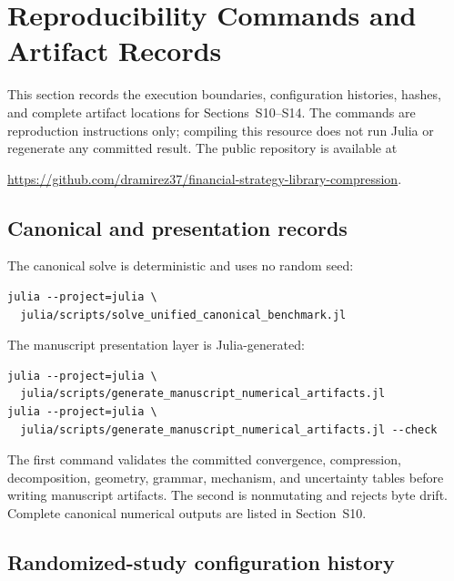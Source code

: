 \section{Reproducibility Commands and Artifact Records}
\label{sec:supp-reproducibility}

This section records the execution boundaries, configuration histories,
hashes, and complete artifact locations for Sections~S10--S14. The commands
are reproduction instructions only; compiling this resource does not run
Julia or regenerate any committed result.  The public repository is available
at
\begin{center}
\url{https://github.com/dramirez37/financial-strategy-library-compression}.
\end{center}

\subsection{Canonical and presentation records}

The canonical solve is deterministic and uses no random seed:
\begin{verbatim}
julia --project=julia \
  julia/scripts/solve_unified_canonical_benchmark.jl
\end{verbatim}
The manuscript presentation layer is Julia-generated:
\begin{verbatim}
julia --project=julia \
  julia/scripts/generate_manuscript_numerical_artifacts.jl
julia --project=julia \
  julia/scripts/generate_manuscript_numerical_artifacts.jl --check
\end{verbatim}
The first command validates the committed convergence, compression,
decomposition, geometry, grammar, mechanism, and uncertainty tables before
writing manuscript artifacts.  The second is nonmutating and rejects byte
drift. Complete canonical numerical outputs are listed in Section~S10.

\subsection{Randomized-study configuration history}

